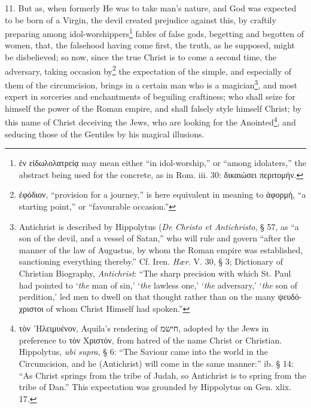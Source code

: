 11. But as, when formerly He was to take man’s nature, and God was expected to be born of a Virgin, the devil created prejudice against this, by craftily preparing among idol-worshippers\footnote{\textgreek{ἐν εἰδωλολατρείᾳ} may mean either “in idol-worship,” or “among idolaters,” the abstract being used for the concrete, as in Rom. iii. 30: \textgreek{δικαιώσει περιτομήν}.} fables of false gods, begetting and begotten of women, that, the falsehood having come first, the truth, as he supposed, might be disbelieved; so now, since the true Christ is to come a second time, the adversary, taking occasion by\footnote{\textgreek{ἐφόδιον}, “provision for a journey,” is here equivalent in meaning to \textgreek{ἀφορμή}, “a starting point,” or “favourable occasion.”} the expectation of the simple, and especially of them of the circumcision, brings in a certain man who is a magician\footnote{Antichrist is described by Hippolytus (\emph{De Christo et Antichristo}, § 57, as “a son of the devil, and a vessel of Satan,” who will rule and govern “after the manner of the law of Augustus, by whom the Roman empire was established, sanctioning everything thereby.” Cf. Iren. \emph{Hær}. V. 30, § 3; Dictionary of Christian Biography, \emph{Antichrist}: “The sharp precision with which St. Paul had pointed to ‘\emph{the} man of sin,’ ‘\emph{the} lawless one,’ ‘\emph{the} adversary,’ ‘\emph{the} son of perdition,’ led men to dwell on that thought rather than on the many \textgreek{ψευδόχριστοι} of whom Christ Himself had spoken.”}, and most expert in sorceries and enchantments of beguiling craftiness; who shall seize for himself the power of the Roman empire, and shall falsely style himself Christ; by this name of Christ deceiving the Jews, who are looking for the Anointed\footnote{\textgreek{τὸν ᾽Ηλειμυένον}, Aquila’s rendering of \texthebrew{ח\texthebrew{ישמ}}, adopted by the Jews in preference to \textgreek{τὸν Χριστόν}, from hatred of the name Christ or Christian. Hippolytus, \emph{ubi supra}, § 6: “The Saviour came into the world in the Circumcision, and he (Antichrist) will come in the same manner:” ib. § 14: “As Christ springs from the tribe of Judah, so Antichrist is to spring from the tribe of Dan.” This expectation was grounded by Hippolytus on Gen. xlix. 17.}, and seducing those of the Gentiles by his magical illusions.

